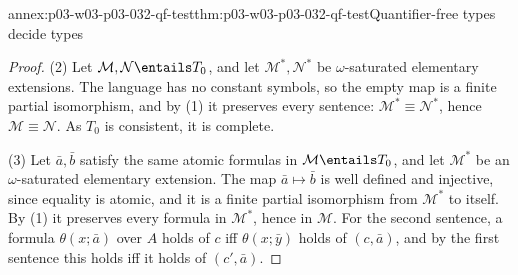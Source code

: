 \begin{annexitem}{annex:p03-w03-p03-032-qf-test}{thm:p03-w03-p03-032-qf-test}{Quantifier-free types decide types}
\begin{proof}
(2) Let \(\mathcal M,\mathcal N\entails T_0\), and let
\(\mathcal M^*,\mathcal N^*\) be \(\omega\)-saturated elementary extensions.  The language has no constant
symbols, so the empty map is a finite partial isomorphism, and by (1) it
preserves every sentence: \(\mathcal M^*\equiv\mathcal N^*\), hence
\(\mathcal M\equiv\mathcal N\).  As \(T_0\) is consistent, it is complete.

(3) Let \(\bar a,\bar b\) satisfy the same atomic formulas in
\(\mathcal M\entails T_0\), and let \(\mathcal M^*\) be an
\(\omega\)-saturated elementary extension.  The map \(\bar a\mapsto\bar b\)
is well defined and injective, since equality is atomic, and it is a finite
partial isomorphism from \(\mathcal M^*\) to itself.  By (1) it preserves
every formula in \(\mathcal M^*\), hence in \(\mathcal M\).  For the second
sentence, a formula \(\theta(x;\bar a)\) over \(A\) holds of \(c\) iff
\(\theta(x;\bar y)\) holds of \((c,\bar a)\), and by the first sentence this
holds iff it holds of \((c',\bar a)\).
\end{proof}
\end{annexitem}

